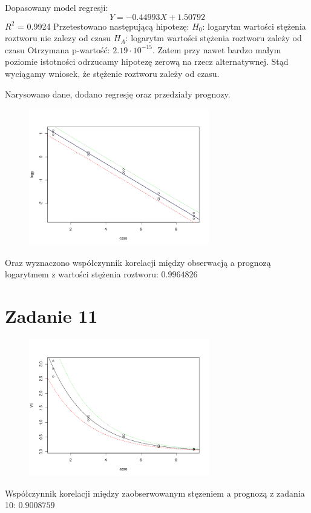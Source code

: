 \documentclass[9pt]{article}  %
\begin{document}
  Dopasowany model regresji:
  $$ Y = -0.44993X  + 1.50792$$
  $R^2$ = 0.9924  \newline
  Przetestowano następującą hipotezę: \newline
  $H_0$: logarytm wartości stężenia roztworu nie zalezy od czasu \newline
  $H_A$: logarytm wartości stężenia roztworu zależy od czasu \newline
  Otrzymana p-wartość: $2.19 \cdot 10^{-15}$. \newline
  Zatem przy nawet bardzo małym poziomie istotności odrzucamy hipotezę zerową na rzecz alternatywnej. Stąd wyciągamy wniosek, że stężenie roztworu zależy od czasu. 
  
    Narysowano dane, dodano regresję oraz przedziały prognozy.
    \begin{figure}[H]
      \centering
      \includegraphics[width=0.7\textwidth]{10.png}
      \caption {}
    \end{figure} 
    Oraz wyznaczono współczynnik korelacji między obserwacją a prognozą logarytmem z wartości stężenia roztworu: $0.9964826$


\section{Zadanie 11}

    \begin{figure}[H]
      \centering
      \includegraphics[width=0.7\textwidth]{11.png}
      \caption {}
    \end{figure} 
    Współczynnik korelacji między zaobserwowanym stęzeniem a prognozą z zadania 10: $0.9008759$
\end{document}
